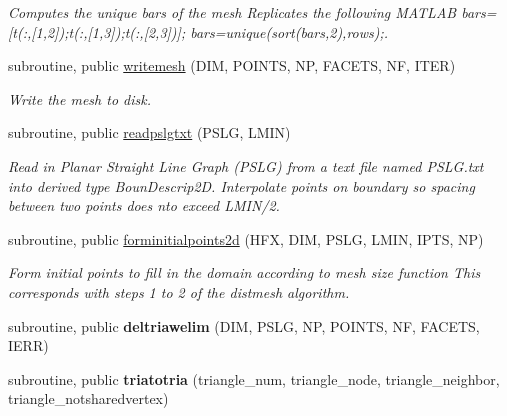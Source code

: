 \begin{DoxyCompactItemize}
\begin{DoxyCompactList}\small\item\em Computes the unique bars of the mesh Replicates the following M\+A\+T\+L\+AB bars=\mbox{[}t(\+:,\mbox{[}1,2\mbox{]});t(\+:,\mbox{[}1,3\mbox{]});t(\+:,\mbox{[}2,3\mbox{]})\mbox{]}; bars=unique(sort(bars,2),\textquotesingle{}rows\textquotesingle{});. \end{DoxyCompactList}\item 
subroutine, public \hyperlink{namespaceutils_afd138f9e85d95b7755f3ce665910574c}{writemesh} (D\+IM, P\+O\+I\+N\+TS, NP, F\+A\+C\+E\+TS, NF, I\+T\+ER)\hypertarget{namespaceutils_afd138f9e85d95b7755f3ce665910574c}{}\label{namespaceutils_afd138f9e85d95b7755f3ce665910574c}

\begin{DoxyCompactList}\small\item\em Write the mesh to disk. \end{DoxyCompactList}\item 
subroutine, public \hyperlink{namespaceutils_a5ec082daa55bbd88ce9e6eabb9b8a514}{readpslgtxt} (P\+S\+LG, L\+M\+IN)\hypertarget{namespaceutils_a5ec082daa55bbd88ce9e6eabb9b8a514}{}\label{namespaceutils_a5ec082daa55bbd88ce9e6eabb9b8a514}

\begin{DoxyCompactList}\small\item\em Read in Planar Straight Line Graph (P\+S\+LG) from a text file named \textquotesingle{}P\+S\+L\+G.\+txt\textquotesingle{} into derived type Boun\+Descrip2D. Interpolate points on boundary so spacing between two points does nto exceed L\+M\+I\+N/2. \end{DoxyCompactList}\item 
subroutine, public \hyperlink{namespaceutils_ad5c2eddefdf604bc1e68666614b1d215}{forminitialpoints2d} (H\+FX, D\+IM, P\+S\+LG, L\+M\+IN, I\+P\+TS, NP)\hypertarget{namespaceutils_ad5c2eddefdf604bc1e68666614b1d215}{}\label{namespaceutils_ad5c2eddefdf604bc1e68666614b1d215}

\begin{DoxyCompactList}\small\item\em Form initial points to fill in the domain according to mesh size function This corresponds with steps 1 to 2 of the distmesh algorithm. \end{DoxyCompactList}\item 
subroutine, public {\bfseries deltriawelim} (D\+IM, P\+S\+LG, NP, P\+O\+I\+N\+TS, NF, F\+A\+C\+E\+TS, I\+E\+RR)\hypertarget{namespaceutils_a68977a44fb6d0dc073160711cf995c3d}{}\label{namespaceutils_a68977a44fb6d0dc073160711cf995c3d}

\item 
subroutine, public {\bfseries triatotria} (triangle\+\_\+num, triangle\+\_\+node, triangle\+\_\+neighbor, triangle\+\_\+notsharedvertex)\hypertarget{namespaceutils_a123830d4d36e05f90f814459592262db}{}\label{namespaceutils_a123830d4d36e05f90f814459592262db}

\end{DoxyCompactItemize}


